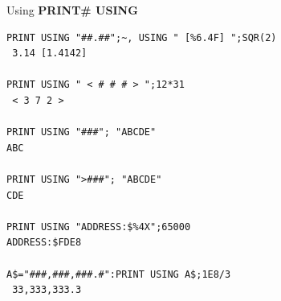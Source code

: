 \begin{description}[leftmargin=2cm,style=nextline]
\newpage
\item [Examples:] Using {\bf PRINT\# USING}

\begin{tcolorbox}[colback=black,coltext=white]
\verbatimfont{\codefont}
\begin{verbatim}
PRINT USING "##.##";~, USING " [%6.4F] ";SQR(2)
 3.14 [1.4142]

PRINT USING " < # # # > ";12*31
 < 3 7 2 >

PRINT USING "###"; "ABCDE"
ABC

PRINT USING ">###"; "ABCDE"
CDE

PRINT USING "ADDRESS:$%4X";65000
ADDRESS:$FDE8

A$="###,###,###.#":PRINT USING A$;1E8/3
 33,333,333.3
\end{verbatim}
\end{tcolorbox}
\end{description}


%
%
%
%
%
%
%
%

